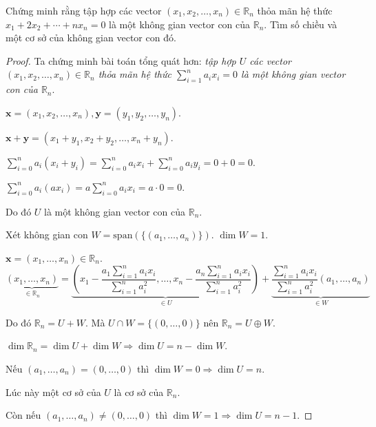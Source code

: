 \documentclass[class=linear-algebra,crop=false]{standalone}
\begin{document}
\begin{exercise}Chứng minh rằng tập hợp các vector $(x_{1}, x_{2}, \ldots, x_{n})\in\mathbb{R}_{n}$ thỏa mãn hệ thức $x_{1} + 2x_{2} + \cdots + nx_{n} = 0$ là một không gian vector con của $\mathbb{R}_{n}$. Tìm số chiều và một cơ sở của không gian vector con đó.
\end{exercise}

\begin{proof}Ta chứng minh bài toán tổng quát hơn: \textit{tập hợp $U$ các vector $(x_{1}, x_{2}, \ldots, x_{n})\in\mathbb{R}_{n}$ thỏa mãn hệ thức $\displaystyle\sum^{n}_{i=1}a_{i}x_{i} = 0$ là một không gian vector con của $\mathbb{R}_{n}$}.
    \par $\mathbf{x} = (x_{1}, x_{2}, \ldots, x_{n}), \mathbf{y} = (y_{1}, y_{2}, \ldots, y_{n})$.
    \par $\mathbf{x} + \mathbf{y} = (x_{1} + y_{1}, x_{2} + y_{2}, \ldots, x_{n} + y_{n})$.
    \par $\displaystyle\sum^{n}_{i=0}a_{i}(x_{i} + y_{i}) = \displaystyle\sum^{n}_{i=0}a_{i}x_{i} + \displaystyle\sum^{n}_{i=0}a_{i}y_{i} = 0 + 0 = 0$.
    \par $\displaystyle\sum^{n}_{i=0}a_{i}(ax_{i}) = a\displaystyle\sum^{n}_{i=0}a_{i}x_{i} = a\cdot 0 = 0$.
    \par Do đó $U$ là một không gian vector con của $\mathbb{R}_{n}$.
    \par Xét không gian con $W = \text{span}(\{(a_{1},\ldots, a_{n})\})$. $\dim W = 1$.
    \par $\mathbf{x} = (x_{1}, \ldots, x_{n}) \in \mathbb{R}_{n}$.
    \[
        \underbrace{(x_{1},\ldots, x_{n})}_{\in\mathbb{R}_{n}} = \underbrace{\left(x_{1} - \frac{a_{1}\sum^{n}_{i=1} a_{i}x_{i}}{\sum^{n}_{i=1} a^{2}_{i}},\ldots, x_{n} - \frac{a_{n}\sum^{n}_{i=1}a_{i}x_{i}}{\sum^{n}_{i=1}a^{2}_{i}}\right)}_{\in U} + \underbrace{\frac{\sum^{n}_{i=1}a_{i}x_{i}}{\sum^{n}_{i=1}a^{2}_{i}}(a_{1},\ldots,a_{n})}_{\in W}
    \]
    \par Do đó $\mathbb{R}_{n} = U + W$. Mà $U\cap W = \{ (0,\ldots, 0) \}$ nên $\mathbb{R}_{n} = U\oplus W$.
    \par $\dim\mathbb{R}_{n} = \dim U + \dim W \Rightarrow \dim U = n - \dim W$.
    \par Nếu $(a_{1},\ldots, a_{n}) = (0,\ldots,0)$ thì $\dim W = 0 \Rightarrow \dim U = n$.
    \par Lúc này một cơ sở của $U$ là cơ sở của $\mathbb{R}_{n}$.
    \par Còn nếu $(a_{1},\ldots, a_{n}) \ne (0,\ldots,0)$ thì $\dim W = 1\Rightarrow \dim U = n - 1$.

\end{proof}
\end{document}
